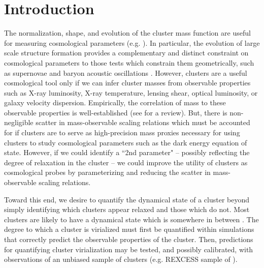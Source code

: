 \documentclass[apj]{emulateapj}
\begin{document}
\section{Introduction}\label{sec:intro}

The normalization, shape, and evolution of the cluster mass function
are useful for measuring cosmological parameters
(e.g. \citealt{1989ApJ...341L..71E, 1998ApJ...508..483W,
2001ApJ...553..545H,  2004PhRvD..70l3008W}). In particular, the
evolution of large scale structure formation provides a complementary
and distinct constraint on cosmological parameters to those tests
which constrain them geometrically, such as supernovae
\citep{1998AJ....116.1009R, 2007ApJ...659...98R} and baryon acoustic
oscillations \citep{2005ApJ...633..560E}. However, clusters are a
useful cosmological tool only if we can infer cluster masses from
observable properties such as X-ray luminosity, X-ray temperature,
lensing shear, optical luminosity, or galaxy velocity
dispersion. Empirically, the correlation of mass to these observable
properties is well-established (see \cite{2005RvMP...77..207V} for a review). But, there
is non-negligible scatter in mass-observable scaling relations which must be
accounted for if clusters are to serve as high-precision mass proxies
necessary for using clusters to study cosmological parameters such as
the dark energy equation of state. However, if we could identify a
``2nd parameter" -- possibly reflecting the degree of relaxation in
the cluster -- we could improve the utility of clusters as
cosmological probes by parameterizing and reducing the scatter in
mass-observable scaling relations.

Toward this end, we desire to quantify the dynamical state of a
cluster beyond simply identifying which clusters appear relaxed and
those which do not. Most clusters are likely to have a dynamical state
which is somewhere in between \citep{2006ApJ...639...64O,
2006ApJ...650..128K, VV08}. The degree to which a cluster is
virialized must first be quantified within simulations that correctly
predict the observable properties of the cluster. Then, predictions
for quantifying cluster virialization may be tested, and possibly
calibrated, with observations of an unbiased sample of clusters
(e.g. REXCESS sample of \citealt{2007A&A...469..363B}).
\end{document}
